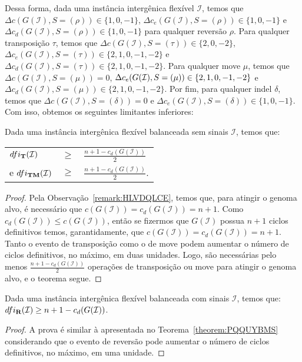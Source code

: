 Dessa forma, dada uma instância intergênica flexível $\mathcal{I}$, temos que $\Delta c(G(\mathcal{I}), S=(\rho)) \in \{1,0,-1\}$, $\Delta c_e(G(\mathcal{I}), S=(\rho)) \in \{1,0,-1\}$ e $\Delta c_d(G(\mathcal{I}), S=(\rho)) \in \{1,0,-1\}$ para qualquer reversão $\rho$. Para qualquer transposição $\tau$, temos que $\Delta c(G(\mathcal{I}), S=(\tau)) \in \{2,0,-2\}$, $\Delta c_e(G(\mathcal{I}), S=(\tau)) \in \{2,1,0,-1,-2\}$ e $\Delta c_d(G(\mathcal{I}), S=(\tau)) \in \{2,1,0,-1,-2\}$. Para qualquer move $\mu$, temos que $\Delta c(G(\mathcal{I}), S=(\mu)) = 0$, $\Delta c_e(G(\mathcal{I}), S=(\mu)) \in \{2,1,0,-1,\break-2\}$ e $\Delta c_d(G(\mathcal{I}), S=(\mu)) \in \{2,1,0,-1,-2\}$. Por fim, para qualquer indel $\delta$, temos que $\Delta c(G(\mathcal{I}), S=(\delta)) = 0$ e $\Delta c_e(G(\mathcal{I}), S=(\delta)) \in \{1,0,{-1}\}$. Com isso, obtemos os seguintes limitantes inferiores:

\begin{theorem}\label{theorem:PQQUYBMS}
Dada uma instância intergênica flexível balanceada sem sinais $\mathcal{I}$, temos que:

\begin{tabular}{lll}
  $dfi_{\textbf{T}}(\mathcal{I})$      & $ \ge $ & $\frac{{n+1} - c_d(G(\mathcal{I} ))}{2}$  \\
  e $dfi_{\textbf{TM}}(\mathcal{I})$   & $ \ge $ & $\frac{{n+1} - c_d(G(\mathcal{I} ))}{2}$. \\
\end{tabular}
\end{theorem}
\begin{proof}
Pela Observação~\ref{remark:HLVDQLCE}, temos que, para atingir o genoma alvo, é necessário que $c(G(\mathcal{I})) = c_d(G(\mathcal{I})) = n+1$. Como $c_d(G(\mathcal{I})) \le c(G(\mathcal{I}))$, então se fizermos que $G(\mathcal{I})$ possua $n+1$ ciclos definitivos temos, garantidamente, que $c(G(\mathcal{I})) = c_d(G(\mathcal{I})) = n+1$. Tanto o evento de transposição como o de move podem aumentar o número de ciclos definitivos, no máximo, em duas unidades. Logo, são necessárias pelo menos $\frac{{n+1} - c_d(G(\mathcal{I} ))}{2}$ operações de transposição ou move para atingir o genoma alvo, e o teorema segue. 
\end{proof}

\begin{theorem}\label{theorem:EUNBEQEX}
Dada uma instância intergênica flexível balanceada com sinais $\mathcal{I}$, temos que: $dfi_{\textbf{R}}(\mathcal{I}) \ge {n+1} - c_d(G(\mathcal{I} ))$.
\end{theorem}
\begin{proof}
A prova é similar à apresentada no Teorema~\ref{theorem:PQQUYBMS} considerando que o evento de reversão pode aumentar o número de ciclos definitivos, no máximo, em uma unidade.
\end{proof}

